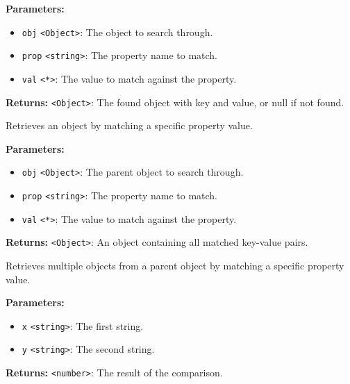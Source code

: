 \documentclass[12pt,a4paper]{article}
\begin{document}
\noindent \textbf{Parameters:}
\begin{itemize}
  \item \texttt{obj} \texttt{<Object>}: The object to search through.
  \item \texttt{prop} \texttt{<string>}: The property name to match.
  \item \texttt{val} \texttt{<*>}: The value to match against the property.
\end{itemize}

\noindent \textbf{Returns:} \texttt{<Object>}: The found object with key and value, or null if not found.

\noindent Retrieves an object by matching a specific property value.

\vspace{5mm}
\noindent {}


\noindent \textbf{Parameters:}
\begin{itemize}
  \item \texttt{obj} \texttt{<Object>}: The parent object to search through.
  \item \texttt{prop} \texttt{<string>}: The property name to match.
  \item \texttt{val} \texttt{<*>}: The value to match against the property.
\end{itemize}

\noindent \textbf{Returns:} \texttt{<Object>}: An object containing all matched key-value pairs.

\noindent Retrieves multiple objects from a parent object by matching a specific property value.

\vspace{5mm}
\noindent {}


\noindent \textbf{Parameters:}
\begin{itemize}
  \item \texttt{x} \texttt{<string>}: The first string.
  \item \texttt{y} \texttt{<string>}: The second string.
\end{itemize}

\noindent \textbf{Returns:} \texttt{<number>}: The result of the comparison.
\end{document}
